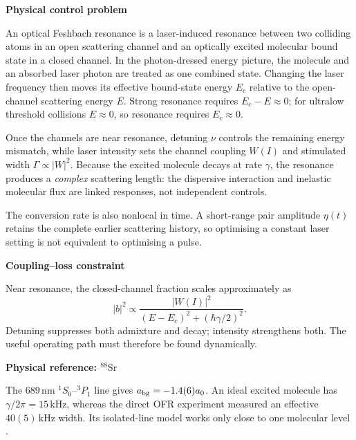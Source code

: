 \documentclass[9pt,a4paper,twocolumn,twoside]{rho-class/rho}
\newcommand{\showcaseheading}[1]{%
    {\color{showcasenavy}\sffamily\bfseries\fontsize{15}{17}\selectfont #1\par}%
    \vspace{2mm}%
}
\newcommand{\showcasesubheading}[1]{%
    {\color{showcasenavy}\sffamily\bfseries\fontsize{11}{13}\selectfont #1\par}%
    \vspace{1.2mm}%
}
\begin{document}
\vspace{2mm}
\begin{minipage}[t]{0.385\textwidth}
    \vspace{0pt}
    \showcaseheading{Physical control problem}
    {\sffamily\fontsize{9.4}{11.7}\selectfont
    An optical Feshbach resonance is a laser-induced resonance between two colliding atoms in an open scattering channel and an optically excited molecular bound state in a closed channel. In the photon-dressed energy picture, the molecule and an absorbed laser photon are treated as one combined state. Changing the laser frequency then moves its effective bound-state energy $E_c$ relative to the open-channel scattering energy $E$. Strong resonance requires $E_c-E\approx0$; for ultralow threshold collisions $E\approx0$, so resonance requires $E_c\approx0$.

    \vspace{1.5mm}
    Once the channels are near resonance, detuning $\nu$ controls the remaining energy mismatch, while laser intensity sets the channel coupling $W(I)$ and stimulated width $\Gamma\propto|W|^2$. Because the excited molecule decays at rate $\gamma$, the resonance produces a \emph{complex} scattering length: the dispersive interaction and inelastic molecular flux are linked responses, not independent controls.

    \vspace{1.5mm}
    The conversion rate is also nonlocal in time. A short-range pair amplitude $\eta(t)$ retains the complete earlier scattering history, so optimising a constant laser setting is not equivalent to optimising a pulse.}

    \vspace{2mm}
    \begin{tcolorbox}[showcasecard,colframe=showcasered!65,colback=showcasered!5,top=1.5mm,bottom=1.5mm]
        \showcasesubheading{Coupling--loss constraint}
        {\sffamily\fontsize{8.6}{10.7}\selectfont
        Near resonance, the closed-channel fraction scales approximately as
        \[
            |b|^2\propto
            \frac{|W(I)|^2}{(E-E_c)^2+(\hbar\gamma/2)^2}.
        \]
        Detuning suppresses both admixture and decay; intensity strengthens both. The useful operating path must therefore be found dynamically.}
    \end{tcolorbox}

    \vspace{1.5mm}
    \begin{tcolorbox}[showcasecard,colframe=showcaseblue!65,colback=showcaseblue!5,top=1.5mm,bottom=1.5mm]
        \showcasesubheading{Physical reference: $^{88}\mathrm{Sr}$}
        {\sffamily\fontsize{8.2}{10.1}\selectfont
        The $689\,\mathrm{nm}$ $^1S_0$--$^3P_1$ line gives
        $a_{\rm bg}=-1.4(6)a_0$.  An ideal excited molecule has
        $\gamma/2\pi=15\,\mathrm{kHz}$, whereas the direct OFR experiment
        measured an effective $40(5)\,\mathrm{kHz}$ width.  Its isolated-line
        model works only close to one molecular level
        \cite{blatt2011measurement,yan2013controlling}.}
    \end{tcolorbox}

\end{minipage}\hfill
\end{document}
